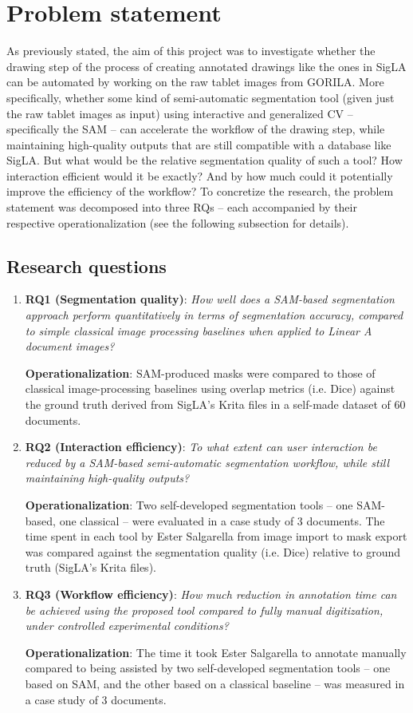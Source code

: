 \section{Problem statement}
As previously stated, the aim of this project was to investigate whether the drawing step of the process of creating annotated drawings like the ones in SigLA can be automated by working on the raw tablet images from \acs{GORILA}.
More specifically, whether some kind of semi-automatic segmentation tool (given just the raw tablet images as input) using interactive and generalized \acs{CV} -- specifically the \acs{SAM} -- can accelerate the workflow of the drawing step, while maintaining high-quality outputs that are still compatible with a database like SigLA.
But what would be the relative segmentation quality of such a tool? How interaction efficient would it be exactly? And by how much could it potentially improve the efficiency of the workflow?
To concretize the research, the problem statement was decomposed into three \acfp{RQ} -- each accompanied by their respective operationalization (see the following subsection for details).

\subsection{Research questions}
\label{research_questions}
\begin{enumerate}
\item \textbf{\acs{RQ}1 (Segmentation quality)}: \label{rq1}
\textit{How well does a \acs{SAM}-based segmentation approach perform quantitatively in terms of segmentation accuracy, compared to simple classical image processing baselines when applied to Linear A document images?}

\textbf{Operationalization}: \acs{SAM}-produced masks were compared to those of classical image-processing baselines using overlap metrics (i.e. \acs{Dice}) against the ground truth derived from SigLA's Krita files in a self-made dataset of 60 documents.
\item \textbf{\acs{RQ}2 (Interaction efficiency)}: \label{rq2}
\textit{To what extent can user interaction be reduced by a \acs{SAM}-based semi-automatic segmentation workflow, while still maintaining high-quality outputs?}

\textbf{Operationalization}: Two self-developed segmentation tools -- one SAM-based, one classical -- were evaluated in a case study of 3 documents. The time spent in each tool by Ester Salgarella from image import to mask export was compared against the segmentation quality (i.e. \acs{Dice}) relative to ground truth (SigLA's Krita files).
\item \textbf{\acs{RQ}3 (Workflow efficiency)}: \label{rq3}
\textit{How much reduction in annotation time can be achieved using the proposed tool compared to fully manual digitization, under controlled experimental conditions?}

\textbf{Operationalization}: The time it took Ester Salgarella to annotate manually compared to being assisted by two self-developed segmentation tools -- one based on SAM, and the other based on a classical baseline -- was measured in a case study of 3 documents.
\end{enumerate}

